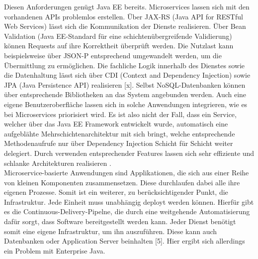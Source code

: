 Diesen Anforderungen genügt Java EE bereits. Microservices lassen sich mit den vorhandenen APIs problemlos erstellen. Über JAX-RS (Java API for RESTful Web Services) lässt sich die Kommunikation der Dienste realisieren. Über Bean Validation (Java EE-Standard für eine schichtenübergreifende Validierung) können Requests auf ihre Korrektheit überprüft werden. Die Nutzlast kann beispielsweise über JSON-P entsprechend umgewandelt werden, um die Übermittlung zu ermöglichen. Die fachliche Logik innerhalb des Dienstes sowie die Datenhaltung lässt sich über CDI (Context and Dependency Injection) sowie JPA (Java Persistence API) realisieren [x]. Selbst NoSQL-Datenbanken können über entsprechende Bibliotheken an das System angebunden werden. Auch eine eigene Benutzeroberfläche lassen sich in solche Anwendungen integrieren, wie es bei Microservices priorisiert wird. Es ist also nicht der Fall, dass ein Service, welcher über das Java EE Framework entwickelt wurde, automatisch eine aufgeblähte Mehrschichtenarchitektur mit sich bringt, welche entsprechende Methodenaufrufe nur über Dependency Injection Schicht für Schicht weiter delegiert. Durch verwenden entsprechender Features lassen sich sehr effiziente und schlanke Architekturen realisieren \cite{jaxcenter.2016}.\\
Microservice-basierte Anwendungen sind Applikationen, die sich aus einer Reihe von kleinen Komponenten zusammensetzen. Diese durchlaufen dabei alle ihre eigenen Prozesse. Somit ist ein weiterer, zu berücksichtigender Punkt, die Infrastruktur. Jede Einheit muss unabhängig deployt werden können. Hierfür gibt es die Continuous-Delivery-Pipelne, die durch eine weitgehende Automatisierung dafür sorgt, dass Software bereitgestellt werden kann. Jeder Dienst benötigt somit eine eigene Infrastruktur, um ihn auszuführen. Diese kann auch Datenbanken oder Application Server beinhalten [5]. Hier ergibt sich allerdings ein Problem mit Enterprise Java.

